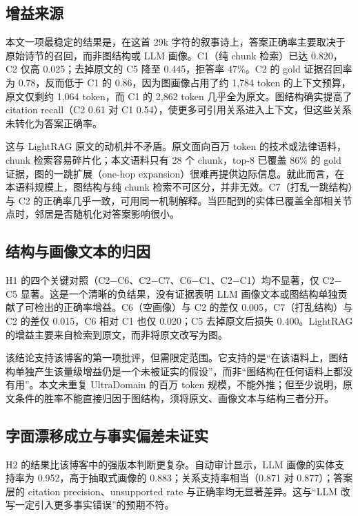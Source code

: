 \subsection{增益来源}

本文一项最稳定的结果是，在这首 29k 字符的叙事诗上，答案正确率主要取决于原始诗节的召回，而非图结构或 LLM 画像。C1（纯 chunk 检索）已达 0.820，C2 仅高 0.025；去掉原文的 C5 降至 0.445，拒答率 47\%。C2 的 gold 证据召回率为 0.78，反而低于 C1 的 0.86，因为图画像占用了约 1,784 token 的上下文预算，原文仅剩约 1,064 token，而 C1 的 2,862 token 几乎全为原文。图结构确实提高了 citation recall（C2 0.61 对 C1 0.54），使更多可引用关系进入上下文，但这些关系未转化为答案正确率。

这与 LightRAG 原文的动机并不矛盾。原文面向百万 token 的技术或法律语料，chunk 检索容易碎片化；本文语料只有 28 个 chunk，top-8 已覆盖 86\% 的 gold 证据，图的一跳扩展（one-hop expansion）很难再提供边际信息。就此而言，在本语料规模上，图结构与纯 chunk 检索不可区分，并非无效。C7（打乱一跳结构）与 C2 的正确率几乎一致，可用同一机制解释。当匹配到的实体已覆盖全部相关节点时，邻居是否随机化对答案影响很小。

\subsection{结构与画像文本的归因}

H1 的四个关键对照（C2$-$C6、C2$-$C7、C6$-$C1、C2$-$C1）均不显著，仅 C2$-$C5 显著。这是一个清晰的负结果，没有证据表明 LLM 画像文本或图结构单独贡献了可检出的正确率增益。C6（空画像）与 C2 的差仅 0.005，C7（打乱结构）与 C2 的差仅 0.015，C6 相对 C1 也仅 0.020；C5 去掉原文后损失 0.400。LightRAG 的增益主要来自检索到原文，而非将原文改写为图。

该结论支持该博客的第一项批评，但需限定范围。它支持的是“在该语料上，图结构单独产生该量级增益仍是一个未被证实的假设”，而非“图结构在任何语料上都没有用”。本文未重复 UltraDomain 的百万 token 规模，不能外推；但至少说明，原文条件的胜率不能直接归因于图结构，须将原文、画像文本与结构三者分开。

\subsection{字面漂移成立与事实偏差未证实}

H2 的结果比该博客中的强版本判断更复杂。自动审计显示，LLM 画像的实体支持率为 0.952，高于抽取式画像的 0.883；关系支持率相当（0.871 对 0.877）；答案层的 citation precision、unsupported rate 与正确率均无显著差异。这与“LLM 改写一定引入更多事实错误”的预期不符。

